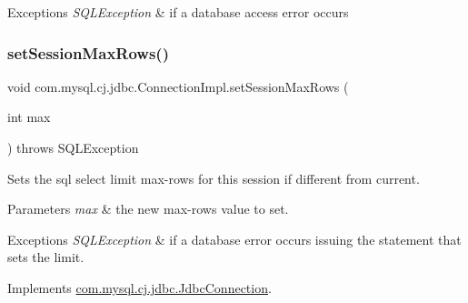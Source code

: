 \begin{DoxyExceptions}{Exceptions}
{\em S\+Q\+L\+Exception} & if a database access error occurs \\
\hline
\end{DoxyExceptions}
\mbox{\label{classcom_1_1mysql_1_1cj_1_1jdbc_1_1_connection_impl_ae55ba5618d7116e5db7ac647ab771087}} 
\subsubsection{\texorpdfstring{set\+Session\+Max\+Rows()}{setSessionMaxRows()}}
{\footnotesize\ttfamily void com.\+mysql.\+cj.\+jdbc.\+Connection\+Impl.\+set\+Session\+Max\+Rows (\begin{DoxyParamCaption}\item[{int}]{max }\end{DoxyParamCaption}) throws S\+Q\+L\+Exception}

Sets the sql select limit max-\/rows for this session if different from current.


\begin{DoxyParams}{Parameters}
{\em max} & the new max-\/rows value to set. \\
\hline
\end{DoxyParams}

\begin{DoxyExceptions}{Exceptions}
{\em S\+Q\+L\+Exception} & if a database error occurs issuing the statement that sets the limit. \\
\hline
\end{DoxyExceptions}


Implements \mbox{\hyperlink{interfacecom_1_1mysql_1_1cj_1_1jdbc_1_1_jdbc_connection}{com.\+mysql.\+cj.\+jdbc.\+Jdbc\+Connection}}.

\mbox{\label{classcom_1_1mysql_1_1cj_1_1jdbc_1_1_connection_impl_ae62d28e9ed05949b66aa0ea00633d51d}} 
